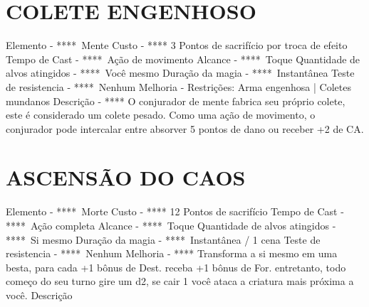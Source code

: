 \documentclass{article}%
\begin{document}
\section{COLETE ENGENHOSO}%
\label{sec:COLETEENGENHOSO}%
Elemento {-} ****~Mente\newline%
Custo {-} **** 3 Pontos de sacrifício por troca de efeito\newline%
Tempo de Cast {-} ****~Ação de movimento\newline%
Alcance {-} ****~Toque\newline%
Quantidade de alvos atingidos {-} ****~Você mesmo\newline%
Duração da magia {-} ****~Instantânea\newline%
Teste de resistencia {-} ****~Nenhum\newline%
Melhoria {-} Restrições: Arma engenhosa | Coletes mundanos\newline%
Descrição {-} **** O conjurador de mente fabrica seu próprio colete, este é considerado um colete pesado. Como uma ação de movimento, o conjurador pode intercalar entre absorver 5 pontos de dano ou receber +2 de CA.\newline%

%
\section{ASCENSÃO DO CAOS}%
\label{sec:ASCENSODOCAOS}%
Elemento {-} ****~Morte\newline%
Custo {-} **** 12 Pontos de sacrifício\newline%
Tempo de Cast {-} ****~Ação completa\newline%
Alcance {-} ****~Toque\newline%
Quantidade de alvos atingidos {-} ****~Si mesmo\newline%
Duração da magia {-} ****~Instantânea / 1 cena\newline%
Teste de resistencia {-} ****~Nenhum\newline%
Melhoria {-} **** Transforma a si mesmo em uma besta, para cada +1 bônus de Dest. receba +1 bônus de For. entretanto, todo começo do seu turno gire um d2, se cair 1 você ataca a criatura mais próxima a você.\newline%
Descrição \newline%

%
\end{document}
